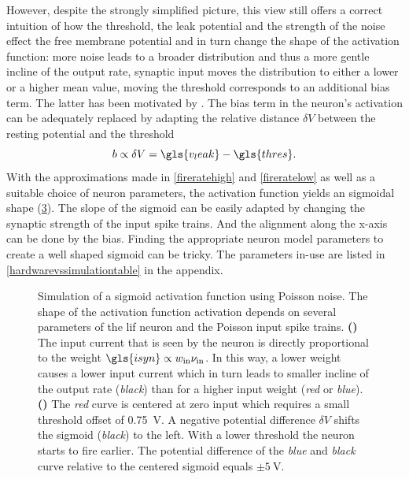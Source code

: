 However, despite the strongly simplified picture, this view still offers a correct intuition of how the threshold, the leak potential and the strength of the noise effect the free membrane potential and in turn change the shape of the activation function: more noise leads to a broader distribution and thus a more gentle incline of the output rate, synaptic input moves the distribution to either a lower or a higher mean value, moving the threshold corresponds to an additional bias term. The latter has been motivated by \cite{petrovici2016stochastic}. The bias term in the neuron's activation can be adequately replaced by adapting the relative distance $\delta V$ between the resting potential and the threshold
\begin{equation}
b \propto \delta V = \gls{v_leak} - \gls{thres}.
\end{equation}
With the approximations made in \cref{fireratehigh} and \cref{fireratelow} as well as a suitable choice of neuron parameters, the activation function yields an sigmoidal shape (\cref{theoreticalactivationfunction}). The slope of the sigmoid can be easily adapted by changing the synaptic strength of the input spike trains. And the alignment along the x-axis can be done by the bias. Finding the appropriate neuron model parameters to create a well shaped sigmoid can be tricky. The parameters in-use are listed in \cref{hardwarevssimulationtable} in the appendix.

\begin{figure}[h!]
	\begin{subfigure}[c]{0.5\textwidth}
		\centering
		\caption{}
		
		\label{theoreticalactivationfunctionweight}
	\end{subfigure}	
	\begin{subfigure}[c]{0.5\textwidth}
		\centering
		\caption{}
		
		\label{theoreticalactivationfunctionbias}
	\end{subfigure}
	\caption[Simulation of a sigmoid activation function using Poisson noise]{Simulation of a sigmoid activation function using Poisson noise. The shape of the activation function \gls{activation} depends on several parameters of the \gls{lif} neuron and the Poisson input  spike trains. \textbf{()} The input current that is seen by the neuron is directly proportional to the weight $\gls{isyn} \propto w_\text{in} \nu_\text{in}$. In this way, a lower weight causes a lower input current which in turn leads to smaller incline of the output rate (\emph{black}) than for a higher input weight (\emph{red} or \emph{blue}). \textbf{()} The \emph{red} curve is centered at zero input which requires a small threshold offset of \SI{0.75}{\V}. A negative potential difference $\delta V$ shifts the sigmoid (\emph{black}) to the left. With a lower threshold the neuron starts to fire earlier. The potential difference of the \emph{blue} and \emph{black} curve relative to the centered sigmoid equals $\pm \SI{5}{\V}$.}
	\label{theoreticalactivationfunction}
\end{figure}

